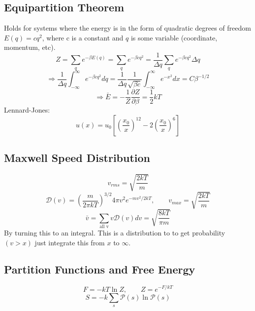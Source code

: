 \documentclass[a4paper,norsk, 10pt]{article}
\begin{document}
\subsection{Equipartition Theorem}
Holds for systems where the energy is in the form of quadratic degrees of freedom $E(q) = cq^2$, where c is a constant and $q$ is some variable (coordinate, momentum, etc).
\begin{equation}
Z = \sum_q e^{-\beta E(q)} = \sum_q e^{-\beta cq^2} = \frac{1}{\Delta q}\sum_q e^{-\beta cq^2} \Delta q 
\end{equation}
\begin{equation}
\Rightarrow \frac{1}{\Delta q}\int_{-\infty}^\infty e^{-\beta cq^2} d q =\frac{1}{\Delta q}\frac{1}{\sqrt{\beta c}}\int_{-\infty}^\infty e^{-x^2} d x = C\beta ^{-1/2}
\end{equation}
\begin{equation}
\Rightarrow \bar{E} = -\frac{1}{Z}\frac{\partial Z}{\partial \beta} = \frac{1}{2}kT
\end{equation}
Lennard-Jones:
\begin{equation}
u(x) = u_0\left[\left(\frac{x_0}{x}\right)^{12} - 2\left(\frac{x_0}{x}\right)^{6}\right]
\end{equation}
\subsection{Maxwell Speed Distribution}
\begin{equation}
v_{rms} = \sqrt{\frac{2kT}{m}}
\end{equation}
\begin{equation}
\mathcal{D}(v) = \left(\frac{m}{2\pi kT}\right)^{3/2}4\pi v^2 e^{-mv^2/2kT},\qquad v_{max} = \sqrt{\frac{2kT}{m}}
\end{equation}
\begin{equation}
\bar{v} = \sum_{\text{all v}} v \mathcal{D}(v)dv = \sqrt{\frac{8kT}{\pi m}}
\end{equation}
By turning this to an integral. This is a distribution to to get probability$(v>x)$ just integrate this from $x$ to $\infty$.
\subsection{Partition Functions and Free Energy}
\begin{equation}
F = -kT\ln Z,\qquad Z = e^{-F/kT}
\end{equation}
\begin{equation}
S = -k\sum_s\mathcal{P}(s) \ln \mathcal{P}(s)
\end{equation}
\end{document}
